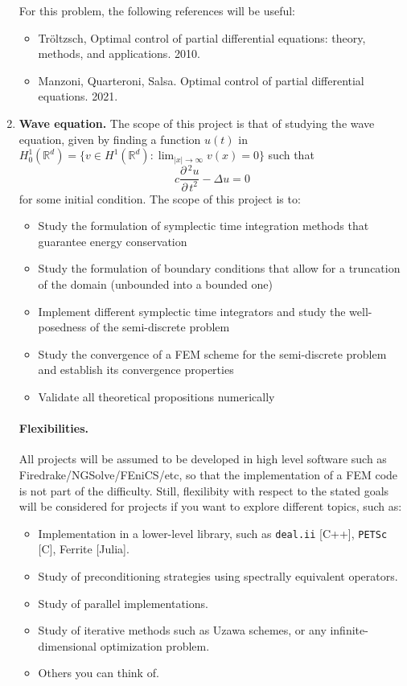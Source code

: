 \documentclass{article}
\newcommand{\R}{\mathbb{R}}
\newcommand{\parder}[2]{\frac{\partial\,#1}{\partial\,#2}}
\begin{document}
\begin{enumerate}
        For this problem, the following references will be useful: 
        \begin{itemize}
            \item Tröltzsch, Optimal control of partial differential equations: theory, methods, and applications. 2010.
            \item Manzoni, Quarteroni, Salsa. Optimal control of partial differential equations. 2021.
        \end{itemize}

    \item \textbf{Wave equation.} The scope of this project is that of studying the wave equation, given by finding a function $u(t)$ in $H_0^1(\R^d)=\{v\in H^1(\R^d): \lim_{|x|\to \infty} v(x) = 0\}$  such that
        $$ c\parder{^2 u}{t^2} -\Delta u=0 $$
        for some initial condition. The scope of this project is to:
        \begin{itemize}
            \item Study the formulation of symplectic time integration methods that guarantee energy conservation
            \item Study the formulation of boundary conditions that allow for a truncation of the domain (unbounded into a bounded one)
            \item Implement different symplectic time integrators and study the well-posedness of the semi-discrete problem
            \item Study the convergence of a FEM scheme for the semi-discrete problem and establish its convergence properties
            \item Validate all theoretical propositions numerically
        \end{itemize}

        \paragraph{\textbf{Flexibilities. }} All projects will be assumed to be developed in high level software such as Firedrake/NGSolve/FEniCS/etc, so that the implementation of a FEM code is not part of the difficulty. Still, flexilibity with respect to the stated goals will be considered for projects if you want to explore different topics, such as: 
        \begin{itemize}
            \item Implementation in a lower-level library, such as \texttt{deal.ii} [C++], \texttt{PETSc} [C], Ferrite [Julia].
            \item Study of preconditioning strategies using spectrally equivalent operators.
            \item Study of parallel implementations.
            \item Study of iterative methods such as Uzawa schemes, or any infinite-dimensional optimization problem.
            \item Others you can think of.
        \end{itemize}


\end{enumerate}
\end{document}
